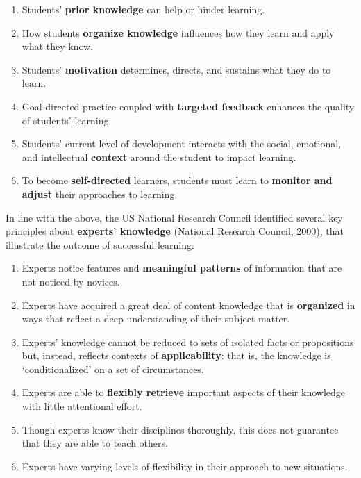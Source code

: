 \documentclass[a4paper, nobind]{templates/ociamthesis}
\begin{document}
\begin{enumerate}
\def\labelenumi{\arabic{enumi}.}
\item
  Students' \textbf{prior knowledge} can help or hinder learning.
\item
  How students \textbf{organize knowledge} influences how they learn and
  apply what they know.
\item
  Students' \textbf{motivation} determines, directs, and sustains what they
  do to learn.
\item
  Goal-directed practice coupled with \textbf{targeted feedback} enhances
  the quality of students' learning.
\item
  Students' current level of development interacts with the social,
  emotional, and intellectual \textbf{context} around the student to impact
  learning.
\item
  To become \textbf{self-directed} learners, students must learn to
  \textbf{monitor and adjust} their approaches to learning.
\end{enumerate}

In line with the above, the US National Research Council identified
several key principles about \textbf{experts' knowledge} (\protect\hyperlink{ref-council2000how}{National Research Council, 2000}),
that illustrate the outcome of successful learning:

\begin{enumerate}
\def\labelenumi{\arabic{enumi}.}
\item
  Experts notice features and \textbf{meaningful patterns} of information
  that are not noticed by novices.
\item
  Experts have acquired a great deal of content knowledge that is
  \textbf{organized} in ways that reflect a deep understanding of their
  subject matter.
\item
  Experts' knowledge cannot be reduced to sets of isolated facts or
  propositions but, instead, reflects contexts of \textbf{applicability}:
  that is, the knowledge is `conditionalized' on a set of
  circumstances.
\item
  Experts are able to \textbf{flexibly retrieve} important aspects of their
  knowledge with little attentional effort.
\item
  Though experts know their disciplines thoroughly, this does not
  guarantee that they are able to teach others.
\item
  Experts have varying levels of flexibility in their approach to new
  situations.
\end{enumerate}
\end{document}
